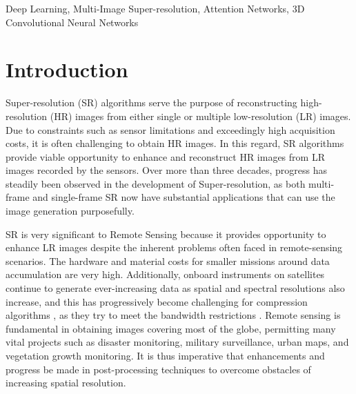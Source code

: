 \documentclass[journal]{IEEEtran}
\begin{document}
\begin{IEEEkeywords}
Deep Learning, Multi-Image Super-resolution, Attention Networks, 3D Convolutional Neural Networks
\end{IEEEkeywords}











\section{Introduction}
Super-resolution (SR) algorithms serve the purpose of reconstructing high-resolution (HR) images from either single or multiple low-resolution (LR) images. Due to constraints such as sensor limitations and exceedingly high acquisition costs, it is often challenging to obtain HR images. In this regard, SR algorithms provide viable opportunity to enhance and reconstruct HR images from LR images recorded by the sensors. Over more than three decades, progress has steadily been observed in the development of Super-resolution, as both multi-frame and single-frame SR now have substantial applications that can use the image generation purposefully.

SR is very significant to Remote Sensing because it provides opportunity to enhance LR images despite the inherent problems often faced in remote-sensing scenarios. The hardware and material costs for smaller missions around data accumulation are very high. Additionally, onboard instruments on satellites continue to generate ever-increasing data as spatial and spectral resolutions also increase, and this has progressively become challenging for compression algorithms \cite{valsesia2014novel}, as they try to meet the bandwidth restrictions \cite{benecki2018evaluating,valsesia2016universal}. 
Remote sensing is fundamental in obtaining images covering most of the globe, permitting many vital projects such as disaster monitoring, military surveillance, urban maps, and vegetation growth monitoring. It is thus imperative that enhancements and progress be made in post-processing techniques to overcome obstacles of increasing spatial resolution.
\end{document}
